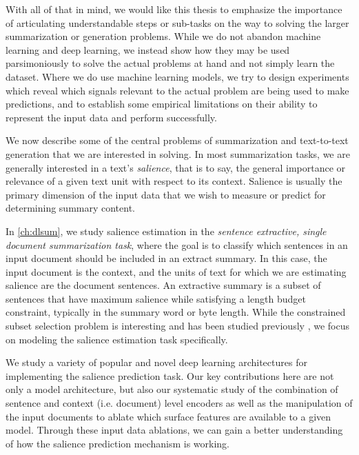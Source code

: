 With all of that in mind, we would like this thesis to emphasize the importance
of articulating understandable steps or sub-tasks on the way to solving the
larger summarization or generation problems.  While we do not abandon machine
learning and deep learning, we instead show how they may be used parsimoniously
to solve the actual problems at hand and not simply learn the dataset. Where we
do use machine learning models, we try to design experiments which reveal which
signals relevant to the actual problem are being used to make predictions, and
to establish some empirical limitations on their ability to represent the input
data and perform successfully. 
 
We now describe some of the central problems of summarization and text-to-text
generation that we are interested in solving.  In most summarization tasks, we
are generally interested in a text's \textit{salience}, that is to say, the
general importance or relevance of a given text unit with respect to its
context. Salience is usually the primary dimension of the input data that we
wish to measure or predict for determining summary content.  

In \autoref{ch:dlsum}, we study salience estimation in the \emph{sentence
extractive, single document summarization task}, where the goal is to classify
which sentences in an input document should be included in an extract summary.
In this case, the input document is the context, and the units of text for
which we are estimating salience are the document sentences.  An extractive
summary is a subset of sentences that have maximum salience while satisfying a
length budget constraint, typically in the summary word or byte length. While
the constrained subset selection problem is interesting and has been studied
previously \citep{goldstein1998,mcdonald2007,lin2010}, we focus on modeling the
salience estimation task specifically. 
 
We study a variety of popular and novel deep learning architectures for
implementing the salience prediction task. Our key contributions here are not
only a model architecture, but also our systematic study of the combination of
sentence and context (i.e. document) level encoders as well as the manipulation
of the input documents to ablate which surface features are available to a
given model. Through these input data ablations, we can gain a better
understanding of how the salience prediction mechanism is working.
 
